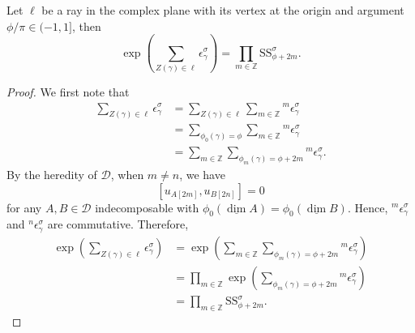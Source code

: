 \documentclass[10pt,a4paper]{amsart}
\newcommand{\Ss}{\mathrm{SS}}
\newcommand{\udv}{\underline{\dim}}
\begin{document}
\begin{theorem}\label{Left part}
Let $\ell$ be a ray in the complex plane with its vertex at the origin and argument $\phi/\pi\in(-1,1]$, then
    \[\exp\left(\sum_{Z(\gamma)\in\ell}\epsilon^\sigma_\gamma\right)=\prod_{m\in\mathbb{Z}}\Ss^\sigma_{\phi+2m}.\]
\end{theorem}

\begin{proof}
    We first note that
    \begin{align*}
        \sum_{Z(\gamma)\in\ell}\epsilon^\sigma_\gamma&=\sum_{Z(\gamma)\in\ell}\sum_{m\in\mathbb{Z}}{^m}\epsilon^\sigma_\gamma\\
        &=\sum_{\phi_0(\gamma)=\phi}\sum_{m\in\mathbb{Z}}{^m}\epsilon^\sigma_\gamma\\
        &=\sum_{m\in\mathbb{Z}}\sum_{\phi_m(\gamma)=\phi+2m}{^m}\epsilon^\sigma_\gamma.
    \end{align*}
    By the heredity of $\mathcal{D}$, when $m\neq n$, we have
    \[[u_{A[2m]},u_{B[2n]}]=0\]
    for any $A,B\in\mathcal{D}$ indecomposable with $\phi_0(\udv A)=\phi_0(\udv B)$. Hence, ${^m}\epsilon^\sigma_\gamma$ and ${^n}\epsilon^\sigma_\gamma$ are commutative. Therefore,
    \begin{align*}
        \exp\left(\sum_{Z(\gamma)\in\ell}\epsilon^\sigma_\gamma\right)&=\exp\left(\sum_{m\in\mathbb{Z}}\sum_{\phi_m(\gamma)=\phi+2m}{^m}\epsilon^\sigma_\gamma\right)\\
        &=\prod_{m\in\mathbb{Z}}\exp\left(\sum_{\phi_m(\gamma)=\phi+2m}{^m}\epsilon^\sigma_\gamma\right)\\
        &=\prod_{m\in\mathbb{Z}}\Ss^\sigma_{\phi+2m}.
    \end{align*}
\end{proof}
\end{document}
